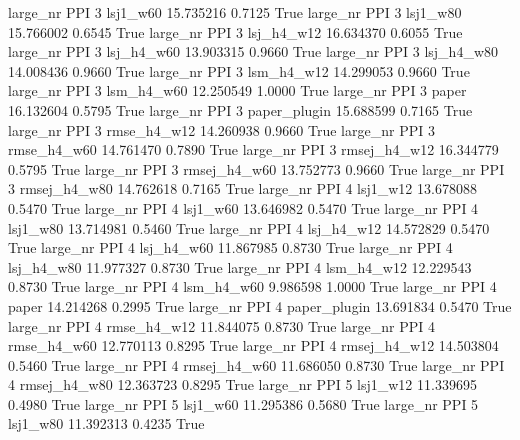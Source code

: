   large_nr      PPI                 3     lsj1_w60   15.735216      0.7125    True
  large_nr      PPI                 3     lsj1_w80   15.766002      0.6545    True
  large_nr      PPI                 3   lsj_h4_w12   16.634370      0.6055    True
  large_nr      PPI                 3   lsj_h4_w60   13.903315      0.9660    True
  large_nr      PPI                 3   lsj_h4_w80   14.008436      0.9660    True
  large_nr      PPI                 3   lsm_h4_w12   14.299053      0.9660    True
  large_nr      PPI                 3   lsm_h4_w60   12.250549      1.0000    True
  large_nr      PPI                 3        paper   16.132604      0.5795    True
  large_nr      PPI                 3 paper_plugin   15.688599      0.7165    True
  large_nr      PPI                 3  rmse_h4_w12   14.260938      0.9660    True
  large_nr      PPI                 3  rmse_h4_w60   14.761470      0.7890    True
  large_nr      PPI                 3 rmsej_h4_w12   16.344779      0.5795    True
  large_nr      PPI                 3 rmsej_h4_w60   13.752773      0.9660    True
  large_nr      PPI                 3 rmsej_h4_w80   14.762618      0.7165    True
  large_nr      PPI                 4     lsj1_w12   13.678088      0.5470    True
  large_nr      PPI                 4     lsj1_w60   13.646982      0.5470    True
  large_nr      PPI                 4     lsj1_w80   13.714981      0.5460    True
  large_nr      PPI                 4   lsj_h4_w12   14.572829      0.5470    True
  large_nr      PPI                 4   lsj_h4_w60   11.867985      0.8730    True
  large_nr      PPI                 4   lsj_h4_w80   11.977327      0.8730    True
  large_nr      PPI                 4   lsm_h4_w12   12.229543      0.8730    True
  large_nr      PPI                 4   lsm_h4_w60    9.986598      1.0000    True
  large_nr      PPI                 4        paper   14.214268      0.2995    True
  large_nr      PPI                 4 paper_plugin   13.691834      0.5470    True
  large_nr      PPI                 4  rmse_h4_w12   11.844075      0.8730    True
  large_nr      PPI                 4  rmse_h4_w60   12.770113      0.8295    True
  large_nr      PPI                 4 rmsej_h4_w12   14.503804      0.5460    True
  large_nr      PPI                 4 rmsej_h4_w60   11.686050      0.8730    True
  large_nr      PPI                 4 rmsej_h4_w80   12.363723      0.8295    True
  large_nr      PPI                 5     lsj1_w12   11.339695      0.4980    True
  large_nr      PPI                 5     lsj1_w60   11.295386      0.5680    True
  large_nr      PPI                 5     lsj1_w80   11.392313      0.4235    True

